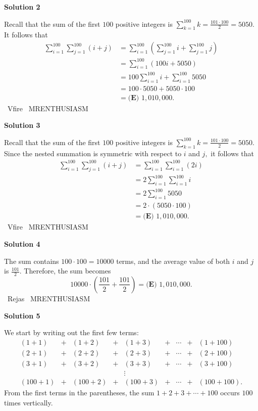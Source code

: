 \begin{enumerate}
 



\textbf{Solution 2}

Recall that the sum of the first $100$ positive integers is $\sum^{100}_{k=1} k = \frac{101\cdot100}{2}=5050.$ It follows that
 \begin{align*} \sum^{100}_{i=1} \sum^{100}_{j=1} (i+j) &= \sum^{100}_{i=1} \left(\sum^{100}_{j=1} i + \sum^{100}_{j=1} j\right) \\ &= \sum^{100}_{i=1} (100i+5050) \\ &= 100\sum^{100}_{i=1} i + \sum^{100}_{i=1} 5050 \\ &= 100\cdot5050+5050\cdot100 \\ &= \boxed{\textbf{(E) }1{,}010{,}000}. \end{align*}
~Vfire ~MRENTHUSIASM

 



\textbf{Solution 3}

Recall that the sum of the first $100$ positive integers is $\sum^{100}_{k=1} k = \frac{101\cdot100}{2}=5050.$ Since the nested summation is symmetric with respect to $i$ and $j,$ it follows that
 \begin{align*} \sum^{100}_{i=1} \sum^{100}_{j=1} (i+j) &= \sum^{100}_{i=1} \sum^{100}_{i=1} (2i) \\ &= 2\sum^{100}_{i=1} \sum^{100}_{i=1} i \\ &= 2\sum^{100}_{i=1} 5050 \\ &= 2\cdot(5050\cdot100) \\ &= \boxed{\textbf{(E) }1{,}010{,}000}. \end{align*}
~Vfire ~MRENTHUSIASM

 



\textbf{Solution 4}

The sum contains $100\cdot100=10000$ terms, and the average value of both $i$ and $j$ is $\frac{101}{2}.$ Therefore, the sum becomes 
 \[10000\cdot\left(\frac{101}{2}+\frac{101}{2}\right)=\boxed{\textbf{(E) }1{,}010{,}000}.\]~Rejas ~MRENTHUSIASM

 



\textbf{Solution 5}

We start by writing out the first few terms:
 \[\begin{array}{ccccccccc} (1+1) &+ &(1+2) &+ &(1+3) &+ &\cdots &+ &(1+100) \\ (2+1) &+ &(2+2) &+ &(2+3) &+ &\cdots &+ &(2+100) \\ (3+1) &+ &(3+2) &+ &(3+3) &+ &\cdots &+ &(3+100) \\ [-1ex] &&&&\vdots&&&& \\ (100+1) &+ &(100+2) &+ &(100+3) &+ &\cdots &+ &(100+100). \end{array}\]From the first terms in the parentheses, the sum $1+2+3+\cdots+100$ occurs $100$ times vertically.


\end{enumerate}
